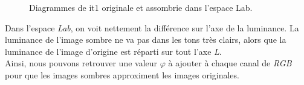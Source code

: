 \documentclass[a4paper,11pt]{article}
\begin{document}
\begin{figure}[H]
  \begin{center}  
    \caption{Diagrammes de it1 originale et assombrie dans l'espace Lab.}
  \end{center}
\end{figure}

Dans l'espace \textit{Lab}, on voit nettement la différence sur l'axe 
de la luminance. La luminance de l'image sombre ne va pas dans les 
tons très clairs, alors que la luminance de l'image d'origine est 
réparti sur tout l'axe \textit{L}.\\

Ainsi, nous pouvons retrouver une valeur $\varphi$ à ajouter à chaque 
canal de \textit{RGB} pour que les images sombres approximent les images
originales.
\end{document}
